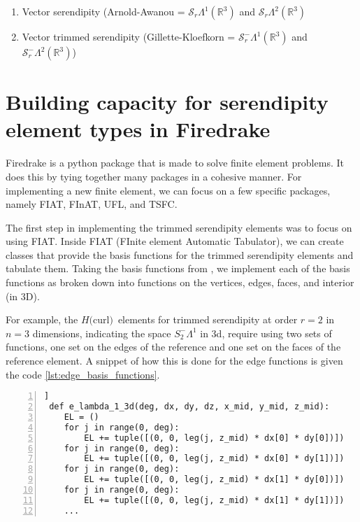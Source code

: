 \documentclass[manuscript,screen]{acmart}
\newcommand{\R}{\mathbb{R}}
\newcommand{\calS}{\mathcal{S}}
\newcommand{\hcurl}{$H($curl$)$}
\begin{document}
  
  
  
  \begin{enumerate}
  \item Vector serendipity (Arnold-Awanou = $\calS_r\Lambda^1(\R^3)$ and $\calS_r\Lambda^2(\R^3)$
  \item Vector trimmed serendipity (Gillette-Kloefkorn = $\calS_r^-\Lambda^1(\R^3)$ and $\calS_r^-\Lambda^2(\R^3)$)
  
  \end{enumerate}
  
  \section{Building capacity for serendipity element types in Firedrake}
  \label{sec:buildcap}
  
  Firedrake is a python package that is made to solve finite element problems.  It does this by tying together many packages in a cohesive manner.  For implementing a new finite element, we can focus on a few specific packages, namely FIAT, FInAT, UFL, and TSFC.  
  
 The first step in implementing the trimmed serendipity elements was to focus on using FIAT.  Inside FIAT (FInite element Automatic Tabulator), we can create classes that provide the basis functions for the trimmed serendipity elements and tabulate them.  Taking the basis functions from \cite{gillette2019computational}, we implement each of the basis functions as broken down into functions on the vertices, edges, faces, and interior (in 3D).  
 
 For example, the \hcurl~elements for trimmed serendipity at order $r=2$ in $n=3$ dimensions, indicating the space $S_2^- \Lambda^1$ in 3d, require using two sets of functions, one set on the edges of the reference and one set on the faces of the reference element.  A snippet of how this is done for the edge functions is given the code \ref{lst:edge_basis_functions}.
 
 \lstset{language=Python}
 \begin{lstlisting}[frame=single, caption={Portion of edge basis function implementation.}, label={lst:edge_basis_functions}, numbers=left]]
 def e_lambda_1_3d(deg, dx, dy, dz, x_mid, y_mid, z_mid):
    EL = ()
    for j in range(0, deg):
        EL += tuple([(0, 0, leg(j, z_mid) * dx[0] * dy[0])])
    for j in range(0, deg):
        EL += tuple([(0, 0, leg(j, z_mid) * dx[0] * dy[1])])
    for j in range(0, deg):
        EL += tuple([(0, 0, leg(j, z_mid) * dx[1] * dy[0])])
    for j in range(0, deg):
        EL += tuple([(0, 0, leg(j, z_mid) * dx[1] * dy[1])])
    ...
 \end{lstlisting}
 
\end{document}
